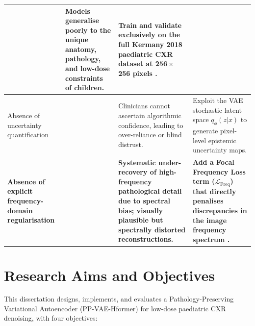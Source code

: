 \documentclass[12pt, a4paper, twoside, openright]{book}
\begin{document}
\begin{table}[htbp]
\begin{tabularx}{\textwidth}{
    >{\raggedright\arraybackslash}p{2.8cm} 
    >{\raggedright\arraybackslash}p{2.2cm} 
    >{\raggedright\arraybackslash}X 
    >{\raggedright\arraybackslash}X
  }
    & Models generalise poorly to the unique anatomy, pathology, and low-dose constraints of children.
    & Train and validate exclusively on the full Kermany 2018 paediatric CXR dataset at 256\,$\times$\,256 pixels \cite{kermany_identifying_2018}. \\
    \midrule
    Absence of uncertainty quantification
    & \cite{kendall_what_2017, ovadia_can_2019}
    & Clinicians cannot ascertain algorithmic confidence, leading to over-reliance or blind distrust.
    & Exploit the VAE stochastic latent space $q_\phi(z|x)$ to generate pixel-level epistemic uncertainty maps. \\
    \midrule
    \textbf{Absence of explicit frequency-domain regularisation}
    & \textbf{\cite{rahaman_spectral_2019, xu_frequency_2020, durall_watch_2020}}
    & \textbf{Systematic under-recovery of high-frequency pathological detail due to spectral bias; visually plausible but spectrally distorted reconstructions.}
    & \textbf{Add a Focal Frequency Loss term ($\mathcal{L}_\mathrm{Freq}$) that directly penalises discrepancies in the image frequency spectrum \cite{jiang_focal_2021}.} \\
    \bottomrule
  \end{tabularx}
\end{table}

\section{Research Aims and Objectives}
\label{sec:intro:aims}

This dissertation designs, implements, and evaluates a Pathology-Preserving Variational Autoencoder (PP-VAE-Hformer) for low-dose paediatric CXR denoising, with four objectives:
\end{document}
